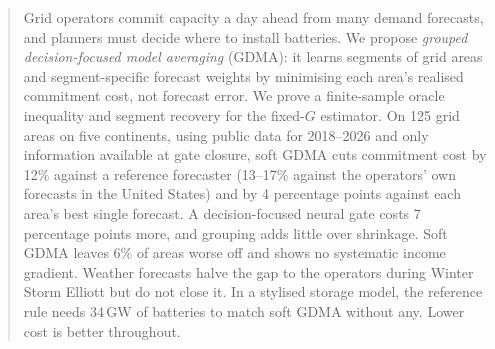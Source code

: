 \begin{abstract}
Grid operators commit capacity a day ahead from many demand forecasts, and planners must decide where to install batteries.
We propose \emph{grouped decision-focused model averaging} (GDMA): it learns segments of grid areas and segment-specific forecast weights by minimising each area's realised commitment cost, not forecast error.
We prove a finite-sample oracle inequality and segment recovery for the fixed-$G$ estimator.
On 125 grid areas on five continents, using public data for 2018--2026 and only information available at gate closure, soft GDMA cuts commitment cost by 12\% against a reference forecaster (13--17\% against the operators' own forecasts in the United States) and by 4 percentage points against each area's best single forecast.
A decision-focused neural gate costs 7 percentage points more, and grouping adds little over shrinkage.
Soft GDMA leaves 6\% of areas worse off and shows no systematic income gradient.
Weather forecasts halve the gap to the operators during Winter Storm Elliott but do not close it.
In a stylised storage model, the reference rule needs 34\,GW of batteries to match soft GDMA without any.
Lower cost is better throughout.
\end{abstract}
